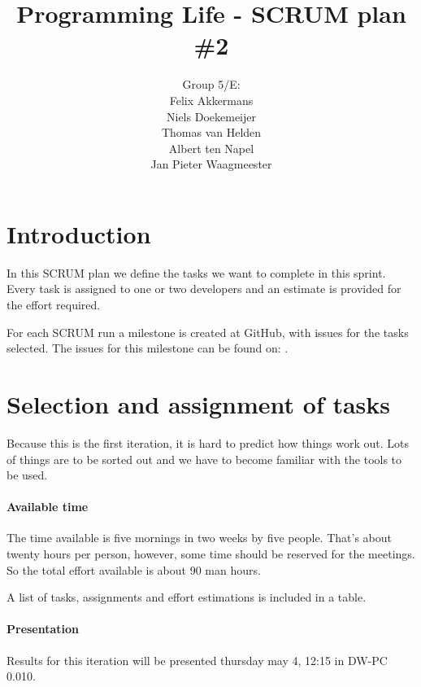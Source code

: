\documentclass[a4paper]{article}
\title{Programming Life - SCRUM plan \#2}
\author{Group 5/E:\\
Felix Akkermans \\
Niels Doekemeijer \\
Thomas van Helden \\
Albert ten Napel \\
Jan Pieter Waagmeester}
\begin{document}
\maketitle

\section{Introduction}
In this SCRUM plan we define the tasks we want to complete in this sprint. Every task is assigned to one or two developers and an estimate is provided for the effort required.

For each SCRUM run a milestone is created at GitHub, with issues for the tasks selected. The issues for this milestone can be found on: .

\section{Selection and assignment of tasks}
Because this is the first iteration, it is hard to predict how things work out. Lots of things are to be sorted out and we have to become familiar with the tools to be used.

\paragraph{Available time}
The time available is five mornings in two weeks by five people. That's about twenty hours per person, however, some time should be reserved for the meetings. So the total effort available is about 90 man hours.

A list of tasks, assignments and effort estimations is included in a table.


\paragraph{Presentation}
Results for this iteration will be presented thursday may 4, 12:15 in DW-PC 0.010.
\end{document}
